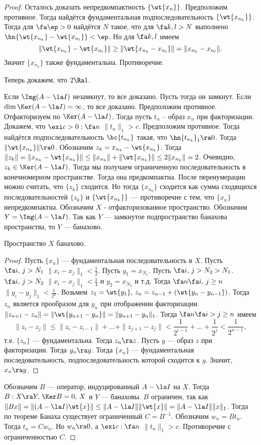 \documentclass[a4paper]{article}
\begin{document}
\begin{proof}
Осталось доказать непредкомпактность $\{\wt{x_n}\}$.
Предположим противное. Тогда найдётся фундаментальная подпоследовательность
$\{\wt{x_{n_k}}\}$. Тогда для $\fa \ep>0$ найдётся $N$ такое, что для $\fa k,l>N$ выполнено $\hn{\wt{x_{n_k}}-\wt{x_{n_l}}}<\ep$.
Но для $\fa k,l$ имеем
$$\|\wt{x_{n_k}}-\wt{x_{n_l}}\|\ge \|\wt{x_{n_k}-x_{n_l}}\|=\|x_{n_k}-x_{n_l}\|.$$
Значит $\{x_{n_k}\}$ также фундаментальна. Противоречие.

Теперь докажем, что $2\Ra1$.

Если $\Img(A-\la I)$ незамкнут, то все доказано. Пусть тогда  он замкнут. Если $\dim \Ker(A-\la I)=\infty$,
то все доказано. Предположим противное. Отфакторизуем по $\Ker(A-\la I)$. Тогда пусть $t_n$ -- образ $x_n$
при факторизации. Докажем, что $\exi c>0: \fa n$ $\|t_n\|_1>c$. Предположим противное. Тогда найдётся
подпоследовательность $\hc{t_{n_k}}$ такая, что $\hn{t_{n_k}}_1\ra 0$. Тогда
$\|\wt{x_{n_k}}\|\ra 0$. Обозначим $z_k=x_{n_k}-\wt{x_{n_k}}$. Тогда
$\|z_k\|=\|x_{n_k}-\wt{x_{n_k}}\|\le\|x_{n_k}\|+\|\wt{x_{n_k}}\|\le 2\|x_{n_k}\|=2$. Очевидно,
$z_k \in \Ker(A-\la I)$. Тогда мы получаем ограниченную последовательность в конечномерном пространстве.
Тогда она предкомпактна. После перенумерации можно считать, что $\{z_k\}$ сходится. Но тогда $\{x_{n_k}\}$
сходится как сумма сходящихся последовательностей $\{z_k\}$ и $\{\wt{x_{n_k}}\}$ --- противоречие с
тем, что $\{x_n\}$ непредкомпактна. Обозначим $X$ - отфакторизованное пространство. Обозначим
$Y=\Img(A-\la I)$. Так как $Y$ --- замкнутое подпространство банахова пространства, то $Y$ --- банахово.

\begin{lemma}
Пространство $X$ банахово.
\end{lemma}
\begin{proof}
Пусть $\{x_n\}$ --- фундаментальная  последовательность в $X$. Пусть $\fa i,\,j>N_1$
$\|x_i-x_j\|_1<\frac1{2}$. Пусть $y_1=x_{N_1}$. Пусть $\fa i,\,j>N_2>N_1$. $\fa i,\,j>N_2$
$\|x_i-x_j\|_1<\frac1{4}$ и $y_2=x_{N_2}$ и т.д. Тогда $\fa n \fa i,\,j\ge n$
$\|y_i-y_j\|_1<\frac1{2^n}$. Возьмем $z_1=\wt{y_1},\, z_n=z_{n-1}+(\wt{y_n-y_{n-1}})$. Тогда
$z_n$ является прообразом для $y_n$ при отображении факторизации.
$\|z_{n+1}-z_n\|=\|\wt{y_{n+1}-y_n}\|=\|y_{n+1}-y_n\|_1$. Тогда $\fa n \fa i>j\ge n$ имеем
$$\|z_i-z_j\|\le\|z_i-z_{i-1}\|+\dots+\|z_{j+1}-z_j\|<\frac1{2^{i-1}}+\dots+\frac1{2^j}<\frac1{2^{n-1}},$$
т.е. $\{z_n\}$ --- фундаментальна. Тогда $z_n\ra z$. Пусть $y$ --- образ $z$ при факторизации. Тогда
$y_n\ra y$. Тогда $\{x_n\}$ --- фундаментальная последовательность, подпоследовательность которой
сходится к $y$. Значит, $x_n\ra y$.
\end{proof}

Обозначим $B$ --- оператор, индуцированный $A-\la I$ на $X$.  Тогда $B:X\ra Y,\, \Ker B=0,\, X$ и
$Y$ --- банаховы. $B$ ограничен, так как $\|Bx\|=\|(A-\la I)\wt{x}\|\le \|A-\la I\|\|\wt{x}\|=\|A-\la I\|\|x\|_1$.
Тогда по теореме Банаха существует ограниченный $C=B^{-1}$. Обозначим $w_n=Bt_n$. Тогда
$t_n=Cw_n$. Но $w_n\ra 0$, а $\exi c: \fa n$ $\|t_n\|_1>c$. Противоречие с ограниченностью $C$.
\end{proof}
\end{document}

